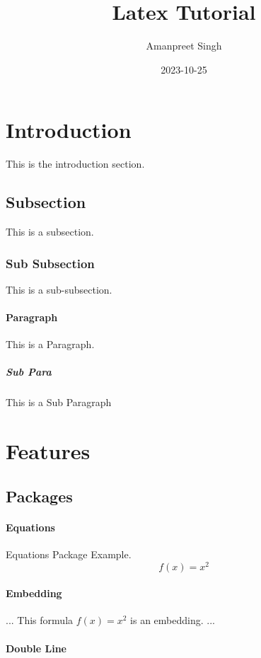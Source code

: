 \documentclass{article}
\title{Latex Tutorial}
\date{2023-10-25}
\author{Amanpreet Singh}
\begin{document}
  \maketitle %
  \tableofcontents
  \newpage %

\section{Introduction}
This is the introduction section.

\subsection{Subsection}
This is a subsection.  

\subsubsection{Sub Subsection}
This is a sub-subsection.

\paragraph{Paragraph} 
This is a Paragraph.

\subparagraph{Sub Para}
This is a Sub Paragraph

\section{Features}

\subsection{Packages}

\paragraph{Equations}
Equations Package Example.
\begin{equation}
  f(x) = x^2
\end{equation}

\paragraph{Embedding}
...
This formula $f(x) = x^2$ is an embedding.
...

\paragraph*{Double Line}
\end{document}
